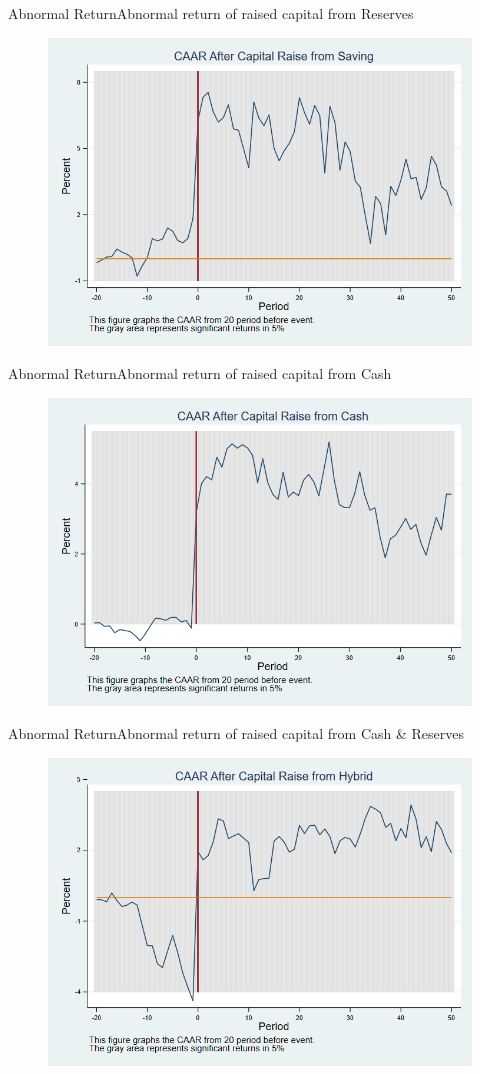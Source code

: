 \documentclass{beamer}
\begin{document}
\begin{frame}{Abnormal Return}{Abnormal return of raised capital from Reserves}
\label{car_4factorSaving}
\begin{figure}
\centering
\includegraphics[width=0.65\linewidth]{Output/car_4factorSaving.png}
\label{fig:car_4factorSaving}
\end{figure}

\end{frame}


\begin{frame}{Abnormal Return}{Abnormal return of raised capital from Cash}
\label{car_4factorCash}
\begin{figure}
\centering
\includegraphics[width=0.65\linewidth]{Output/car_4factorCash.png}
\label{fig:car_4factorCash}
\end{figure}
\end{frame}


\begin{frame}{Abnormal Return}{Abnormal return of raised capital from Cash \& Reserves}
\label{car_4factorHybrid}
\begin{figure}
\centering
\includegraphics[width=0.65\linewidth]{Output/car_4factorHybrid.png}
\label{fig:car_4factorHybrid}
\end{figure}

\end{frame}
\end{document}
